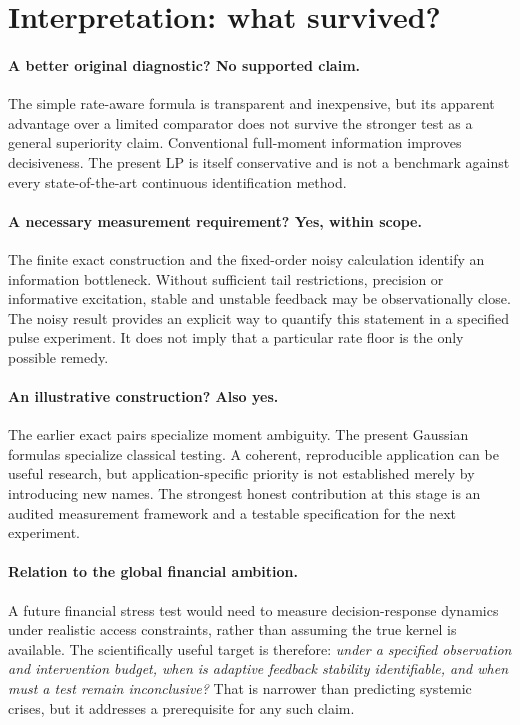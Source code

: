\documentclass[11pt]{article}
\theoremstyle{remark}\newtheorem{remark}[proposition]{Remark}
\begin{document}
\section{Interpretation: what survived?}
\paragraph{A better original diagnostic? No supported claim.}
The simple rate-aware formula is transparent and inexpensive, but its apparent advantage over a limited comparator does not survive the stronger test as a general superiority claim. Conventional full-moment information improves decisiveness. The present LP is itself conservative and is not a benchmark against every state-of-the-art continuous identification method.

\paragraph{A necessary measurement requirement? Yes, within scope.}
The finite exact construction and the fixed-order noisy calculation identify an information bottleneck. Without sufficient tail restrictions, precision or informative excitation, stable and unstable feedback may be observationally close. The noisy result provides an explicit way to quantify this statement in a specified pulse experiment. It does not imply that a particular rate floor is the only possible remedy.

\paragraph{An illustrative construction? Also yes.}
The earlier exact pairs specialize moment ambiguity. The present Gaussian formulas specialize classical testing. A coherent, reproducible application can be useful research, but application-specific priority is not established merely by introducing new names. The strongest honest contribution at this stage is an audited measurement framework and a testable specification for the next experiment.

\paragraph{Relation to the global financial ambition.}
A future financial stress test would need to measure decision-response dynamics under realistic access constraints, rather than assuming the true kernel is available. The scientifically useful target is therefore: \emph{under a specified observation and intervention budget, when is adaptive feedback stability identifiable, and when must a test remain inconclusive?} That is narrower than predicting systemic crises, but it addresses a prerequisite for any such claim.
\end{document}
